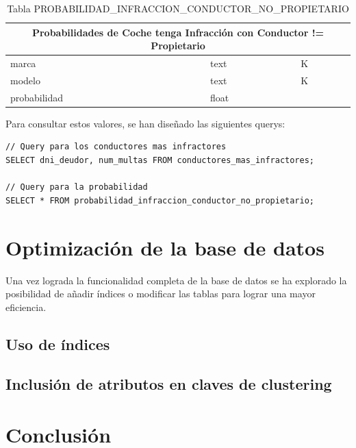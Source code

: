 \documentclass[]{article}
\begin{document}
\begin{itemize}
     \begin{table}[H]
        \centering
        \begin{tabular}{lll} 
            \toprule
            \multicolumn{3}{c}{\large\textbf{Probabilidades de Coche tenga Infracción con Conductor != Propietario}} \\ 
            \midrule
            marca      & text & K\\
            modelo     & text & K\\
            probabilidad   & float & \\
            \bottomrule
        \end{tabular}
        \caption {Tabla PROBABILIDAD\_INFRACCION\_CONDUCTOR\_NO\_PROPIETARIO}
     \end{table}

    Para consultar estos valores, se han diseñado las siguientes querys:

    \begin{lstlisting}[language=cql, caption=Querys para el caso de uso 3]
// Query para los conductores mas infractores
SELECT dni_deudor, num_multas FROM conductores_mas_infractores;

// Query para la probabilidad
SELECT * FROM probabilidad_infraccion_conductor_no_propietario;

    \end{lstlisting}
\end{itemize}

\section{Optimización de la base de datos}
\label{sec:optimusprime}
Una vez lograda la funcionalidad completa de la base de datos se ha explorado la posibilidad de añadir índices o modificar las tablas para lograr una mayor eficiencia.

\subsection{Uso de índices}

\subsection{Inclusión de atributos en claves de clustering}

\newpage
\section{Conclusión}
\label{sec:conclusion}
\end{document}
